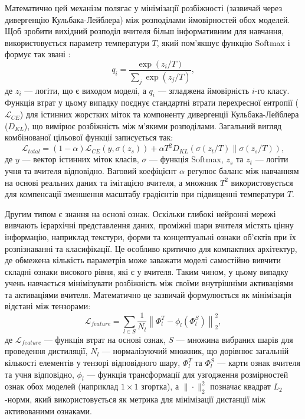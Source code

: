 \documentclass{pma-mthesis}
\begin{document}
Математично цей механізм полягає у мінімізації розбіжності (зазвичай через дивергенцію Кульбака-Лейблера) між розподілами ймовірностей обох моделей. Щоб зробити вихідний розподіл вчителя більш інформативним для навчання, використовується параметр температури $T$, який пом'якшує функцію Softmax і формує так звані :
\begin{equation}
    q_i = \frac{\exp(z_i / T)}{\sum_j \exp(z_j / T)},
\end{equation}
де $z_i$ --- логіти, що є виходом моделі, а $q_i$ --- згладжена ймовірність $i$-го класу. Функція втрат у цьому випадку поєднує стандартні втрати перехресної ентропії ($\mathcal{L}_{CE}$) для істинних жорстких міток та компоненту дивергенції Кульбака-Лейблера ($D_{KL}$), що вимірює розбіжність між м'якими розподілами. Загальний вигляд комбінованої цільової функції записується так:
\begin{equation}
    \mathcal{L}_{total} = (1 - \alpha) \mathcal{L}_{CE}(y, \sigma(z_s)) + \alpha T^2 D_{KL}(\sigma(z_t/T) \parallel \sigma(z_s/T)),
\end{equation}
де $y$ --- вектор істинних міток класів, $\sigma$ --- функція Softmax, $z_s$ та $z_t$ --- логіти учня та вчителя відповідно. Ваговий коефіцієнт $\alpha$ регулює баланс між навчанням на основі реальних даних та імітацією вчителя, а множник $T^2$ використовується для компенсації зменшення масштабу градієнтів при підвищенні температури $T$.

Другим типом є знання на основі ознак. Оскільки глибокі нейронні мережі вивчають ієрархічні представлення даних, проміжні шари вчителя містять цінну інформацію, наприклад текстури, форми та концептуальні ознаки об'єктів при їх розпізнаванні та класифікації. Це особливо критично для компактних архітектур, де обмежена кількість параметрів може заважати моделі самостійно вивчити складні ознаки високого рівня, які є у вчителя. Таким чином, у цьому випадку учень навчається мінімізувати розбіжність між своїми внутрішніми активаціями та активаціями вчителя. Математично це зазвичай формулюється як мінімізація відстані між тензорами:
\begin{equation}
    \mathcal{L}_{feature} = \sum_{l \in S} \frac{1}{N_l} \left\| \Phi_l^T - \phi_l(\Phi_l^S) \right\|_2^2,
\end{equation}
де $\mathcal{L}_{feature}$ --- функція втрат на основі ознак, $S$ --- множина вибраних шарів для проведення дистиляції, $N_l$ --- нормалізуючий множник, що дорівнює загальній кількості елементів у тензорі відповідного шару, $\Phi_l^T$ та $\Phi_l^S$ --- карти ознак вчителя та учня відповідно, $\phi_l$ --- функція трансформації для узгодження розмірностей ознак обох моделей (наприклад $1 \times 1$ згортка), а $\|\cdot\|_2^2$ позначає квадрат $L_2$-норми, який використовується як метрика для мінімізації дистанції між активованими ознаками. 
\end{document}

